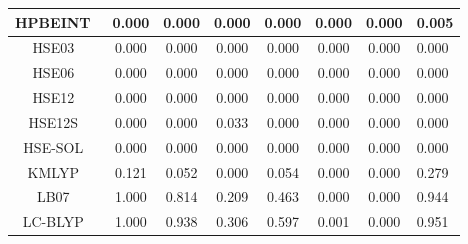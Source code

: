 \begin{tabular}{|c|c|c|c|c|c|c|l|}
                                   HPBEINT~\cite{Fabiano2013_673} &                0.000 &                          0.000 &             0.000 &                        0.000 &                0.000 &                0.000 &                       0.005 \\ \hline
                     HSE03~\cite{Heyd2003_8207,Heyd2003_8207_err} &                0.000 &                          0.000 &             0.000 &                        0.000 &                0.000 &                0.000 &                       0.000 \\ \hline
   HSE06~\cite{Heyd2003_8207,Heyd2003_8207_err,Krukau2006_224106} &                0.000 &                          0.000 &             0.000 &                        0.000 &                0.000 &                0.000 &                       0.000 \\ \hline
                                   HSE12~\cite{Moussa2012_204117} &                0.000 &                          0.000 &             0.000 &                        0.000 &                0.000 &                0.000 &                       0.000 \\ \hline
                                  HSE12S~\cite{Moussa2012_204117} &                0.000 &                          0.000 &             0.033 &                        0.000 &                0.000 &                0.000 &                       0.000 \\ \hline
                                HSE-SOL~\cite{Schimka2011_024116} &                0.000 &                          0.000 &             0.000 &                        0.000 &                0.000 &                0.000 &                       0.000 \\ \hline
                                      KMLYP~\cite{Kang2001_11040} &                0.121 &                          0.052 &             0.000 &                        0.054 &                0.000 &                0.000 &                       0.279 \\ \hline
                                    LB07~\cite{Livshits2007_2932} &                1.000 &                          0.814 &             0.209 &                        0.463 &                0.000 &                0.000 &                       0.944 \\ \hline
                                   LC-BLYP~\cite{Tawada2004_8425} &                1.000 &                          0.938 &             0.306 &                        0.597 &                0.001 &                0.000 &                       0.951 \\ \hline

\end{tabular}
